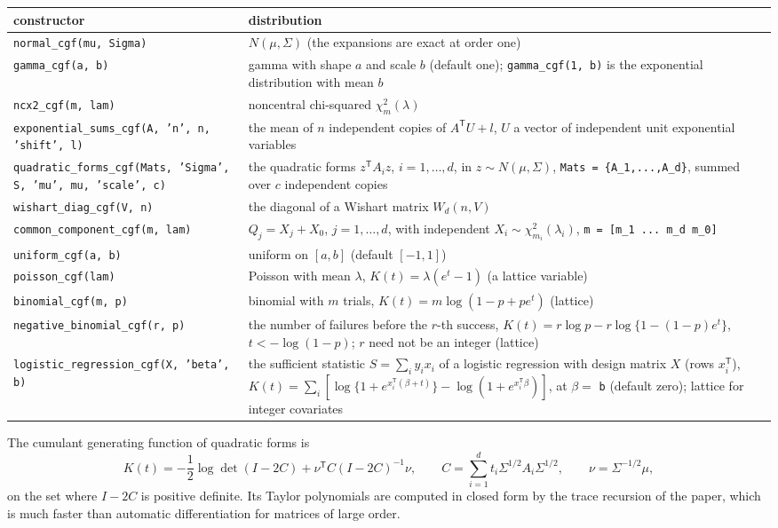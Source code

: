 \documentclass[11pt]{article}
\newcommand{\prog}[1]{\texttt{#1}}
\newcommand{\tp}{^{\mathsf T}}
\begin{document}
\begin{longtable}{@{}>{\raggedright\arraybackslash}p{}>{\raggedright\arraybackslash}p{}@{}}
\toprule
constructor & distribution\\
\midrule
\endhead
\prog{normal\_cgf(mu, Sigma)} & $N(\mu,\Sigma)$ (the expansions are exact at order one)\\
\prog{gamma\_cgf(a, b)} & gamma with shape $a$ and scale $b$ (default one); \prog{gamma\_cgf(1, b)} is the exponential distribution with mean $b$\\
\prog{ncx2\_cgf(m, lam)} & noncentral chi-squared $\chi^2_m(\lambda)$\\
\prog{exponential\_sums\_cgf(A, 'n', n, 'shift', l)} & the mean of $n$ independent copies of $A\tp U+l$, $U$ a vector of independent unit exponential variables\\
\prog{quadratic\_forms\_cgf(Mats, 'Sigma', S, 'mu', mu, 'scale', c)} & the quadratic forms $z\tp A_iz$, $i=1,\ldots,d$, in $z\sim N(\mu,\Sigma)$, \prog{Mats = \{A\_1,...,A\_d\}}, summed over $c$ independent copies\\
\prog{wishart\_diag\_cgf(V, n)} & the diagonal of a Wishart matrix $W_d(n,V)$\\
\prog{common\_component\_cgf(m, lam)} & $Q_j=X_j+X_0$, $j=1,\ldots,d$, with independent $X_i\sim\chi^2_{m_i}(\lambda_i)$, \prog{m = [m\_1 ... m\_d m\_0]}\\
\prog{uniform\_cgf(a, b)} & uniform on $[a,b]$ (default $[-1,1]$)\\
\prog{poisson\_cgf(lam)} & Poisson with mean $\lambda$, $K(t)=\lambda(e^t-1)$ (a lattice variable)\\
\prog{binomial\_cgf(m, p)} & binomial with $m$ trials, $K(t)=m\log(1-p+pe^t)$ (lattice)\\
\prog{negative\_binomial\_cgf(r, p)} & the number of failures before the $r$-th success, $K(t)=r\log p-r\log\{1-(1-p)e^t\}$, $t<-\log(1-p)$; $r$ need not be an integer (lattice)\\
\prog{logistic\_regression\_cgf(X, 'beta', b)} & the sufficient statistic $S=\sum_iy_ix_i$ of a logistic regression with design matrix $X$ (rows $x_i\tp$), $K(t)=\sum_i[\log\{1+e^{x_i\tp(\beta+t)}\}-\log(1+e^{x_i\tp\beta})]$, at $\beta=$ \prog{b} (default zero); lattice for integer covariates\\
\bottomrule
\end{longtable}

\noindent The cumulant generating function of quadratic forms is
\[
K(t)=-\frac12\log\det(I-2C)+\nu\tp C(I-2C)^{-1}\nu,\qquad C=\sum_{i=1}^{d}t_i\Sigma^{1/2}A_i\Sigma^{1/2},\qquad \nu=\Sigma^{-1/2}\mu,
\]
on the set where $I-2C$ is positive definite. Its Taylor polynomials are computed in closed form
by the trace recursion of the paper, which is much faster than automatic differentiation for
matrices of large order.
\end{document}
